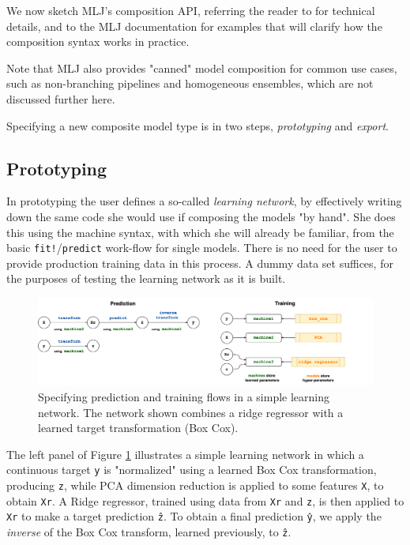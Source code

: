 \documentclass{article}
\begin{document}
We now sketch MLJ's composition API, referring the reader to
\cite{Blaom_I} for technical details, and to the MLJ documentation
\cite{MLJdocs,MLJtutorials} for examples that will clarify how the
composition syntax works in practice.

Note that MLJ also provides "canned" model composition for common use
cases, such as non-branching pipelines and homogeneous ensembles,
which are not discussed further here.

Specifying a new composite model type is in two steps,
\textit{prototyping} and \textit{export}.

\subsection{Prototyping}

In prototyping the user defines a so-called \textit{learning network},
by effectively writing down the same code she would use if composing
the models "by hand". She does this using the machine syntax, with
which she will already be familiar, from the basic
\texttt{fit!}/\texttt{predict} work-flow for single models. There is
no need for the user to provide production training data in this
process. A dummy data set suffices, for the purposes of testing the
learning network as it is built.

\begin{figure}
  \centering
  \mbox{\hspace{0.02\textwidth}}\includegraphics[width=1.05\textwidth]{target_transformer}
  \caption{Specifying prediction and training flows in a simple
    learning network. The network shown combines a ridge regressor
    with a learned target transformation (Box Cox).}
  \label{fig:fig2}
\end{figure}

The left panel of Figure \ref{fig:fig2} illustrates a simple
learning network in which a continuous target \texttt{y} is
"normalized" using a learned Box Cox transformation, producing
\texttt{z}, while PCA dimension reduction is applied to some features
\texttt{X}, to obtain \texttt{Xr}. A Ridge regressor, trained using
data from \texttt{Xr} and \texttt{z}, is then applied to \texttt{Xr}
to make a target prediction \texttt{\^{z}}. To obtain a final
prediction \texttt{\^{y}}, we apply the \textit{inverse} of the Box
Cox transform, learned previously, to \texttt{\^{z}}.
\end{document}
